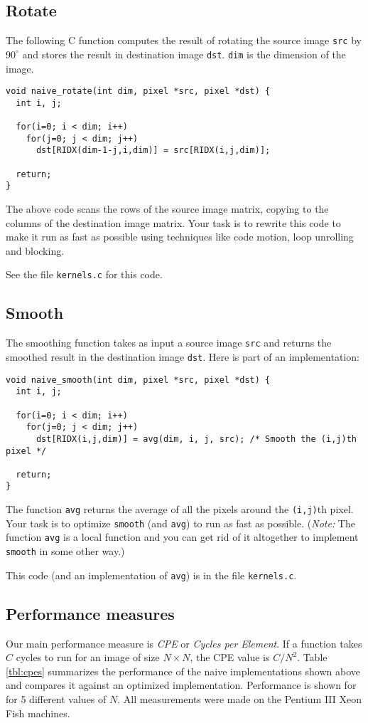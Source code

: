 \documentclass[11pt]{article}
\begin{document}
\subsection*{Rotate}
The following C function computes the result of rotating 
the source image {\tt src} by $90^\circ$ and stores the result in
destination image {\tt dst}. {\tt dim} is the dimension of the image. 
\small{\begin{verbatim}
void naive_rotate(int dim, pixel *src, pixel *dst) {
  int i, j;

  for(i=0; i < dim; i++) 
    for(j=0; j < dim; j++) 
      dst[RIDX(dim-1-j,i,dim)] = src[RIDX(i,j,dim)];

  return;
}
\end{verbatim}}
The above code scans the rows of the source image matrix, copying to
the columns of the destination image matrix. 
Your task is to rewrite this code to make it run as fast as
possible using techniques like code motion, loop unrolling
and blocking.

See the file {\tt kernels.c} for this code.

\subsection*{Smooth}
The smoothing function takes as input a source image {\tt src} and
returns the smoothed result in the destination image {\tt dst}.
Here is part of an implementation:
\small{\begin{verbatim}
void naive_smooth(int dim, pixel *src, pixel *dst) {
  int i, j;

  for(i=0; i < dim; i++)
    for(j=0; j < dim; j++)
      dst[RIDX(i,j,dim)] = avg(dim, i, j, src); /* Smooth the (i,j)th pixel */

  return;
}
\end{verbatim}}
The function {\tt avg} returns the average of all the pixels around
the {\tt (i,j)}th pixel. Your task is to optimize {\tt smooth} (and
{\tt avg}) to run
as fast as possible. ({\em Note:} The function {\tt avg} is a local
function and you can get rid of it altogether to implement {\tt
smooth} in some other way.)

This code (and an implementation of {\tt avg}) is in the file {\tt kernels.c}.

\subsection*{Performance measures}
Our main performance measure is {\em CPE} or {\em Cycles per Element}.
If a function takes $C$ cycles to run for an image of size $N \times
N$, the CPE value is $C/N^2$.
Table \ref{tbl:cpes} summarizes the performance of the naive
implementations shown above and compares it against an optimized
implementation. Performance is shown for 
for 5 different values of $N$. All measurements were made on the
Pentium III Xeon Fish machines.
\end{document}

